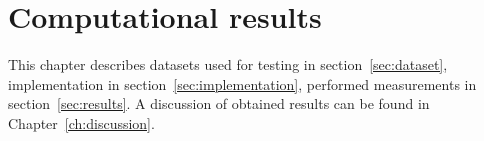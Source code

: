 \chapter{Computational results}\label{ch:computational-results}

This chapter describes datasets used for testing in section~\ref{sec:dataset},
implementation in section~\ref{sec:implementation},
performed measurements in section~\ref{sec:results}.
A discussion of obtained results can be found in Chapter~\ref{ch:discussion}.




